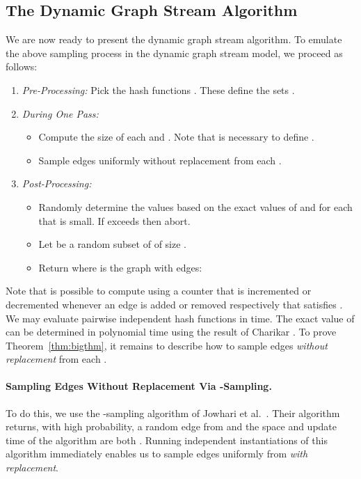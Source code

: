 \documentclass[11pt]{article}
\begin{document}
\subsection{The Dynamic Graph Stream Algorithm}

We are now ready to present the dynamic graph stream algorithm. To emulate the above sampling process in the dynamic graph stream model, we proceed as follows:
\begin{enumerate}
\item {\em Pre-Processing:} Pick the hash functions . These define the sets .
\item {\em During One Pass:} 
\begin{itemize}
\item Compute the size of each  and . Note that  is necessary to define .
\item Sample  edges  uniformly without replacement from each . 
\end{itemize}
\item {\em Post-Processing:}
\begin{itemize}
\item Randomly determine the values  based on the exact values of  and  for each  that is small. If  exceeds  then abort.
\item Let  be a random subset of  of size .
\item Return  where  is the graph with edges:

\end{itemize}
\end{enumerate}

Note that is possible to compute   using a  counter that is incremented or decremented whenever an edge  is added or removed respectively that satisfies . We may evaluate pairwise independent hash functions in  time. The exact value of  can be determined in polynomial time using the result of Charikar \cite{Charikar00}. To prove Theorem~\ref{thm:bigthm}, it remains to describe how to sample  edges \emph{without replacement} from each .

\paragraph{Sampling Edges Without Replacement Via -Sampling.} To do this, we use the -sampling algorithm of Jowhari et al.~\cite{JowhariST11}. Their algorithm returns, with high probability, a random edge from  and the space and update time of the algorithm are both . Running  independent instantiations of this algorithm immediately enables us to sample  edges uniformly from  \emph{with replacement}. 
\end{document}
